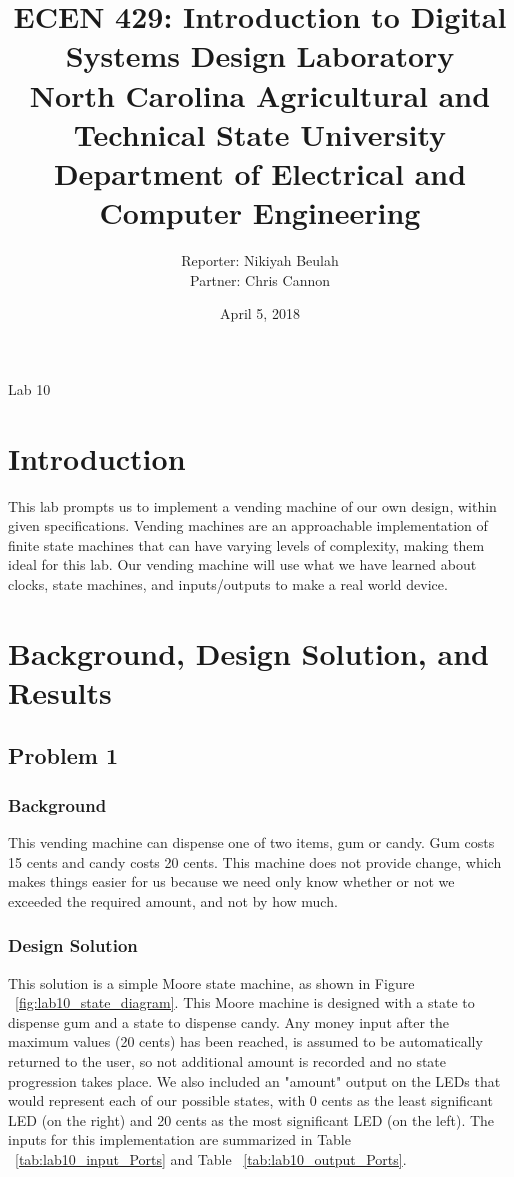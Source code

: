 \documentclass[11pt]{article}
\title {{\titleFont ECEN 429: Introduction to Digital Systems Design Laboratory \\ North Carolina Agricultural and Technical State University \\ Department of Electrical and Computer Engineering}} %
\author{\titleFont Reporter: Nikiyah Beulah \\ \titleFont Partner: Chris Cannon} %
\date{\titleFont April 5, 2018}
\begin{document}
\begin{titlingpage}
\maketitle
\begin{center}
	Lab 10
\end{center}
\end{titlingpage}

\section{Introduction}
This lab prompts us to implement a vending machine of our own design, within given specifications. Vending machines are an approachable implementation of finite state machines that can have varying levels of complexity, making them ideal for this lab. Our vending machine will use what we have learned about clocks, state machines, and inputs/outputs to make a real world device.

\section{Background, Design Solution, and Results}

\subsection{Problem 1 }

\subsubsection{Background}
This vending machine can dispense one of two items, gum or candy. Gum costs 15 cents and candy costs 20 cents. This machine does not provide change, which makes things easier for us because we need only know whether or not we exceeded the required amount, and not by how much.

\subsubsection{Design Solution}
This solution is a simple Moore state machine, as shown in Figure ~\ref{fig:lab10_state_diagram}. This Moore machine is designed with a state to dispense gum and a state to dispense candy. Any money input after the maximum values (20 cents) has been reached, is assumed to be automatically returned to the user, so not additional amount is recorded and no state progression takes place. We also included an "amount" output on the LEDs that would represent each of our possible states, with 0 cents as the least significant LED (on the right) and 20 cents as the most significant LED (on the left). The inputs for this implementation are summarized in Table ~\ref{tab:lab10_input_Ports} and Table ~\ref{tab:lab10_output_Ports}.
\end{document}
